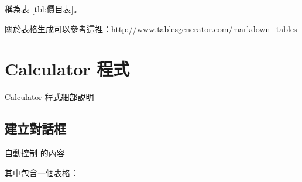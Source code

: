 \documentclass[12pt,,]{report}
\begin{document}
稱為表 \ref{tbl:價目表}。

關於表格生成可以參考這裡：\url{http://www.tablesgenerator.com/markdown_tables}

\hypertarget{calculator-ux7a0bux5f0f}{%
\chapter{Calculator 程式}\label{calculator-ux7a0bux5f0f}}

Calculator 程式細部說明

\hypertarget{ux5efaux7acbux5c0dux8a71ux6846}{%
\section{建立對話框}\label{ux5efaux7acbux5c0dux8a71ux6846}}

自動控制 的內容

其中包含一個表格：
\end{document}
